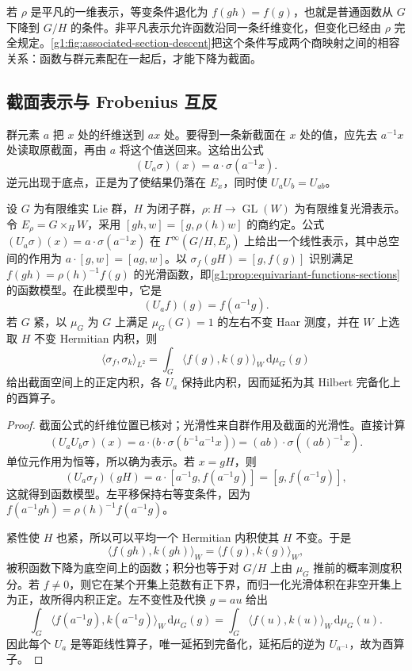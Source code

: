 若 \(\rho\) 是平凡的一维表示，等变条件退化为 \(f(gh)=f(g)\)，也就是普通函数从 \(G\) 下降到 \(G/H\) 的条件。非平凡表示允许函数沿同一条纤维变化，但变化已经由 \(\rho\) 完全规定。\cref{g1:fig:associated-section-descent}把这个条件写成两个商映射之间的相容关系：函数与群元素配在一起后，才能下降为截面。



\subsection{截面表示与 Frobenius 互反}
\label{g1:subsec:2003:03}
群元素 \(a\) 把 \(x\) 处的纤维送到 \(ax\) 处。要得到一条新截面在 \(x\) 处的值，应先去 \(a^{-1}x\) 处读取原截面，再由 \(a\) 将这个值送回来。这给出公式
\[
	(U_a\sigma)(x)=a\cdot\sigma(a^{-1}x).
\]
逆元出现于底点，正是为了使结果仍落在 \(E_x\)，同时使 \(U_aU_b=U_{ab}\)。

\begin{proposition}\label{g1:prop:section-left-representation}
	设 \(G\) 为有限维实 Lie 群，\(H\) 为闭子群，\(\rho:H\to\operatorname{GL}(W)\) 为有限维复光滑表示。令 \(E_\rho=G\times_H W\)，采用 \([gh,w]=[g,\rho(h)w]\) 的商约定。公式 \((U_a\sigma)(x)=a\cdot\sigma(a^{-1}x)\) 在 \(\Gamma^\infty(G/H,E_\rho)\) 上给出一个线性表示，其中总空间的作用为 \(a\cdot[g,w]=[ag,w]\)。以 \(\sigma_f(gH)=[g,f(g)]\) 识别满足 \(f(gh)=\rho(h)^{-1}f(g)\) 的光滑函数，即\cref{g1:prop:equivariant-functions-sections}的函数模型。在此模型中，它是
	\begin{equation}\label{g1:eq:homogeneous-section-left-action}
		(U_af)(g)=f(a^{-1}g).
	\end{equation}
	若 \(G\) 紧，以 \(\mu_G\) 为 \(G\) 上满足 \(\mu_G(G)=1\) 的左右不变 Haar 测度，并在 \(W\) 上选取 \(H\) 不变 Hermitian 内积，则
	\[
		\langle\sigma_f,\sigma_k\rangle_{L^2}
		=\int_G\langle f(g),k(g)\rangle_W\,\mathrm{d}\mu_G(g)
	\]
	给出截面空间上的正定内积，各 \(U_a\) 保持此内积，因而延拓为其 Hilbert 完备化上的酉算子。
\end{proposition}
\begin{proof}
	截面公式的纤维位置已核对；光滑性来自群作用及截面的光滑性。直接计算
	\[
		(U_aU_b\sigma)(x)
		=a\cdot\bigl(b\cdot\sigma(b^{-1}a^{-1}x)\bigr)
		=(ab)\cdot\sigma((ab)^{-1}x).
	\]
	单位元作用为恒等，所以确为表示。若 \(x=gH\)，则
	\[
		(U_a\sigma_f)(gH)
		=a\cdot[a^{-1}g,f(a^{-1}g)]
		=[g,f(a^{-1}g)],
	\]
	这就得到函数模型。左平移保持右等变条件，因为
	\(f(a^{-1}gh)=\rho(h)^{-1}f(a^{-1}g)\)。

	紧性使 \(H\) 也紧，所以可以平均一个 Hermitian 内积使其 \(H\) 不变。于是
	\[
		\langle f(gh),k(gh)\rangle_W=\langle f(g),k(g)\rangle_W,
	\]
	被积函数下降为底空间上的函数；积分也等于对 \(G/H\) 上由 \(\mu_G\) 推前的概率测度积分。若 \(f\ne0\)，则它在某个开集上范数有正下界，而归一化光滑体积在非空开集上为正，故所得内积正定。左不变性及代换 \(g=au\) 给出
	\[
		\int_G\langle f(a^{-1}g),k(a^{-1}g)\rangle_W\,\mathrm{d}\mu_G(g)
		=\int_G\langle f(u),k(u)\rangle_W\,\mathrm{d}\mu_G(u).
	\]
	因此每个 \(U_a\) 是等距线性算子，唯一延拓到完备化，延拓后的逆为 \(U_{a^{-1}}\)，故为酉算子。
\end{proof}

